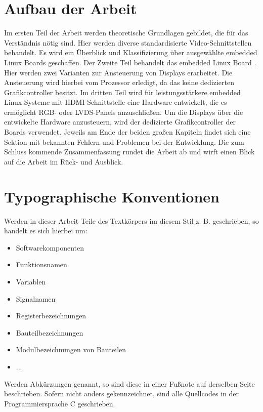 \section{Aufbau der Arbeit}
Im ersten Teil der Arbeit werden theoretische Grundlagen gebildet, die für das Verständnis nötig sind. Hier werden diverse standardisierte Video-Schnittstellen behandelt. Es wird ein Überblick und Klassifizierung über ausgewählte embedded Linux Boards geschaffen.
Der Zweite Teil behandelt das embedded Linux Board . Hier werden zwei Varianten zur Ansteuerung von Displays erarbeitet. Die Ansteuerung wird hierbei vom Prozessor erledigt, da das  keine dedizierten Grafikcontroller besitzt.
Im dritten Teil wird für leistungsstärkere embedded Linux-Systeme mit HDMI-Schnittstelle eine Hardware entwickelt, die es ermöglicht RGB- oder LVDS-Panels anzuschließen. Um die Displays über die entwickelte Hardware anzusteuern, wird der dedizierte Grafikcontroller der Boards verwendet. Jeweils am Ende der beiden großen Kapiteln findet sich eine Sektion mit bekannten Fehlern und Problemen bei der Entwicklung. Die zum Schluss kommende Zusammenfassung rundet die Arbeit ab und wirft einen Blick auf die Arbeit im Rück- und Ausblick.  

\section{Typographische Konventionen}
Werden in dieser Arbeit Teile des Textkörpers im diesem Stil z. B.  geschrieben, so handelt es sich hierbei um:
\begin{itemize}
\item Softwarekomponenten
\item Funktionsnamen
\item Variablen
\item Signalnamen
\item Registerbezeichnungen
\item Bauteilbezeichnungen
\item Modulbezeichnungen von Bauteilen
\item ...
\end{itemize}
Werden Abkürzungen genannt, so sind diese in einer Fußnote auf derselben Seite beschrieben.
Sofern nicht anders gekennzeichnet, sind alle Quellcodes in der Programmiersprache C geschrieben.
